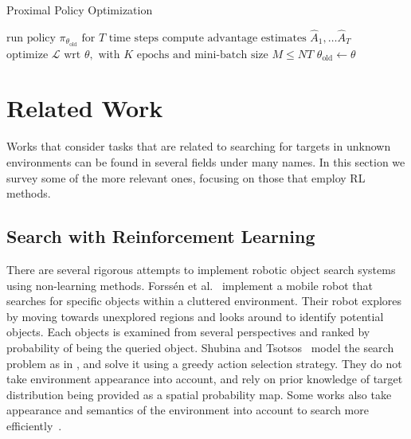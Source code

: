 \begin{algorithm}
    \caption{Proximal Policy Optimization}
    \label{alg:ppo}
    \begin{algorithmic}
                \State \(\text{run policy } \pi_{\theta_\text{old}} \text{ for } T \text{ time steps}\)
                \State \(\text{compute advantage estimates } \hat{A}_1, \dots \hat{A}_T\)
            \EndFor
            \State \(\text{optimize } \mathcal{L} \text{ wrt } \theta, \text{ with } K \text{ epochs and mini-batch size } M \leq NT\)
            \State \(\theta_{\text{old}} \leftarrow \theta\)
        \EndFor
    \end{algorithmic}
\end{algorithm}

\section{Related Work}
\label{sec:relatedwork}

Works that consider tasks that are related to searching for targets in unknown environments can be found in several fields under many names.
In this section we survey some of the more relevant ones, focusing on those that employ RL methods.

\subsection{Search with Reinforcement Learning}

There are several rigorous attempts to implement robotic object search systems using non-learning methods.
Forssén et al.~\cite{forssen_informed_2008} implement a mobile robot that searches for specific objects within a cluttered environment.
Their robot explores by moving towards unexplored regions and looks around to identify potential objects.
Each objects is examined from several perspectives and ranked by probability of being the queried object.
Shubina and Tsotsos~\cite{shubina_visual_2010} model the search problem as in \cite{ye_complexity-level_2001}, and solve it using a greedy action selection strategy.
They do not take environment appearance into account, and rely on prior knowledge of target distribution being provided as a spatial probability map.
Some works also take appearance and semantics of the environment into account to search more efficiently~\cite{aydemir_search_2011,aydemir_active_2013}.

